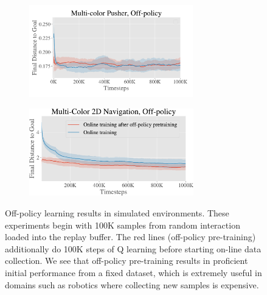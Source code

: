 \begin{figure}[ht!]
    \centering
    \begin{subfigure}[b]{0.48\textwidth}
        \center
        \includegraphics[height=4cm]{ccrig/img/offpolicy_pusher_camera_ready-crop.pdf}
    \end{subfigure}
    \hspace{0.3cm}
    \begin{subfigure}[b]{0.48\textwidth}
        \includegraphics[height=3.8cm]{ccrig/img/offpolicy_pointmass_camera_ready-crop.pdf}
    \end{subfigure}
    \caption{Off-policy learning results in simulated environments. These experiments begin with 100K samples from random interaction loaded into the replay buffer. The red lines (off-policy pre-training) additionally do 100K steps of Q learning before starting on-line data collection. We see that off-policy pre-training results in proficient initial performance from a fixed dataset, which is extremely useful in domains such as robotics where collecting new samples is expensive.}
    \label{fig:offpolicy}
\end{figure}
